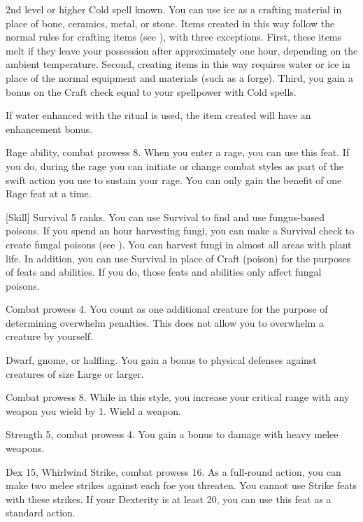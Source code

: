 \featpre 2nd level or higher Cold spell known.
\featben You can use ice as a crafting material in place of bone, ceramics, metal, or stone.
Items created in this way follow the normal rules for crafting items (see ), with three exceptions.
First, these items melt if they leave your possession after approximately one hour, depending on the ambient temperature.
Second, creating items in this way requires water or ice in place of the normal equipment and materials (such as a forge).
Third, you gain a bonus on the Craft check equal to your spellpower with Cold spells.

If water enhanced with the  ritual is used, the item created will have an enhancement bonus.

\featpres Rage ability, combat prowess 8.
\featben When you enter a rage, you can use this feat. If you do, during the rage you can initiate or change combat styles as part of the swift action you use to sustain your rage.
 You can only gain the benefit of one Rage feat at a time.

[Skill]
\featpre Survival 5 ranks.
\featben You can use Survival to find and use fungus-based poisons.
If you spend an hour harvesting fungi, you can make a Survival check to create fungal poisons (see ).
You can harvest fungi in almost all areas with plant life.
In addition, you can use Survival in place of Craft (poison) for the purposes of feats and abilities.
If you do, those feats and abilities only affect fungal poisons.

\featpre Combat prowess 4.
\featben You count as one additional creature for the purpose of determining overwhelm penalties.
This does not allow you to overwhelm a creature by yourself.

\featpres Dwarf, gnome, or halfling.
\featben You gain a  bonus to physical defenses against creatures of size Large or larger.


\featpre Combat prowess 8.
\featben While in this style, you increase your critical range with any weapon you wield by 1.
\stylereq Wield a weapon.

\featpres Strength 5, combat prowess 4.
\featben You gain a  bonus to damage with heavy melee weapons.

\featpres Dex 15, Whirlwind Strike, combat prowess 16.
\featben As a full-round action, you can make two melee strikes against each foe you threaten. You cannot use Strike feats with these strikes.
If your Dexterity is at least 20, you can use this feat as a standard action.

